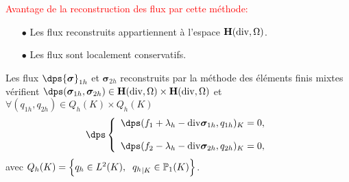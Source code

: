 \documentclass{beamer}
\renewcommand{\div}{\mathrm{div}}
\begin{document}
\begin{frame}

\textcolor{red}{Avantage de la reconstruction des flux par cette méthode:}
\begin{itemize}
\item[$\bullet$]Les flux reconstruits appartiennent à l'espace $\textbf H(\div,\Omega)$.
\item[$\bullet$] Les flux sont localement conservatifs.
\end{itemize}
\begin{theorem}
Les flux $\dps {\bm \sigma}_{1h}$ et ${\bm \sigma}_{2h}$ reconstruits 
par la méthode des éléments finis mixtes vérifient
$\dps ({\bm \sigma}_{1h},{\bm \sigma}_{2h}) \in \textbf H(\div,\Omega) \times \textbf H(\div,\Omega)$ et $\forall (q_{1h},q_{2h})\in Q_h(K) \times Q_h(K) $
\begin{equation}
\dps
\left\lbrace\begin{array}{ll}
\dps (f_1+\lambda_h-\div {\bm \sigma}_{1h},q_{1h})_K=0, \\\\
\dps (f_2-\lambda_h-\div {\bm \sigma}_{2h},q_{2h})_K=0,
\end{array}
\right.
\label{eq: reconstruction_flux}
\end{equation}
avec $Q_h(K)=\left\{q_h \in L^2(K), \hspace{0.2 cm} {q_h}_{|K} \in {\mathbb{P}}_1(K)\right\}$.
\end{theorem}
\end{frame}
\end{document}
